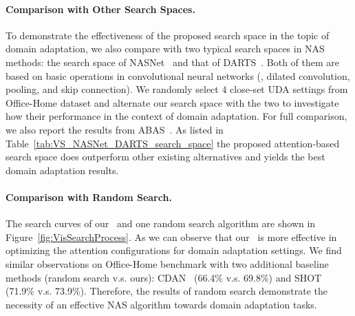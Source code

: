 \documentclass[10pt,twocolumn,letterpaper]{article}
\begin{document}
\begin{table}
    \centering
    \caption{Comparison of the proposed search space and two existing typical ones. The Experiments are conducted on the four closed-set UDA settings on Office-Home dataset.}
    \label{tab:VS_NASNet_DARTS_search_space}
    \small{
    }
    \vspace{-2mm}
\end{table} 
\paragraph{Comparison with Other Search Spaces.}
To demonstrate the effectiveness of the proposed search space in the topic of domain adaptation, we also compare with two typical search spaces in NAS methods: the search space of NASNet~\cite{zoph2018NASNet} and that of DARTS~\cite{liu2018DARTS}. Both of them are based on basic operations in convolutional neural networks (\eg, dilated convolution, pooling, and skip connection). We randomly select $4$ close-set UDA settings from Office-Home dataset and alternate our search space with the two to investigate how their performance in the context of domain adaptation.
For full comparison, we also report the results from ABAS~\cite{robbiano2021adversarial}.
As listed in Table~\ref{tab:VS_NASNet_DARTS_search_space} the proposed attention-based search space does outperform other existing alternatives and yields the best domain adaptation results.

\vspace{-2mm}
\paragraph{Comparison with Random Search.}
The search curves of our \iMethod\, and one random search algorithm are shown in Figure~\ref{fig:VisSearchProcess}.
As we can observe that our \iMethod\, is more effective in optimizing the attention configurations for domain adaptation settings.
We find similar observations on Office-Home benchmark with two additional baseline methods (random search v.s. ours): CDAN~\cite{long2018CDAN} (66.4\% v.s. 69.8\%) and SHOT~\cite{liang2020shot} (71.9\% v.s. 73.9\%).
Therefore, the results of random search demonstrate the necessity of an effective NAS algorithm towards domain adaptation tasks.
\end{document}
